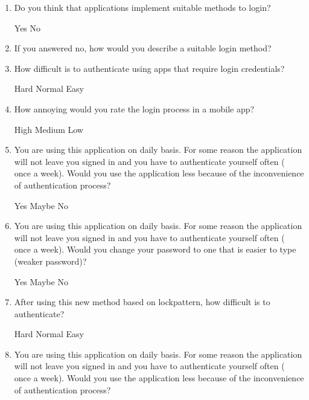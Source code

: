 
\newcommand{\tab}[1]{\hspace{.2\textwidth}\rlap{#1}}

\begin{enumerate}
  \item Do you think that applications implement suitable methods to login?
  
Yes	\tab\tab	No
  		
  \item If you answered no, how would you describe a suitable login method?
  
\noindent\makebox[\linewidth]{\rule{\textwidth}{0.4pt}}
\noindent\makebox[\linewidth]{\rule{\textwidth}{0.4pt}}
\noindent\makebox[\linewidth]{\rule{\textwidth}{0.4pt}} 
  
  \item How difficult is to authenticate using apps that require login credentials?
  
Hard	\tab\tab 	Normal 	\tab\tab 	Easy
  
  \item How annoying would you rate the login process in a mobile app?
  
High	\tab\tab	Medium	\tab\tab 	Low
  
  \item You are using this application on daily basis. For some reason the application will not leave you signed in and you have to authenticate yourself often (~ once a week). Would you use the application less because of the inconvenience of authentication process?
  
Yes	\tab\tab	Maybe	\tab\tab 	No  
  
  \item You are using this application on daily basis. For some reason the application will not leave you signed in and you have to authenticate yourself often (~ once a week). Would you change your password to one that is easier to type (weaker password)?
  
Yes	\tab\tab	Maybe	\tab\tab 	No   
  
  \item After using this new method based on lockpattern, how difficult is to authenticate?
  
Hard	\tab\tab	Normal	\tab\tab	Easy 
  
  \item You are using this application on daily basis. For some reason the application will not leave you signed in and you have to authenticate yourself often (~ once a week). Would you use the application less because of the inconvenience of authentication process?
  

\end{enumerate}
